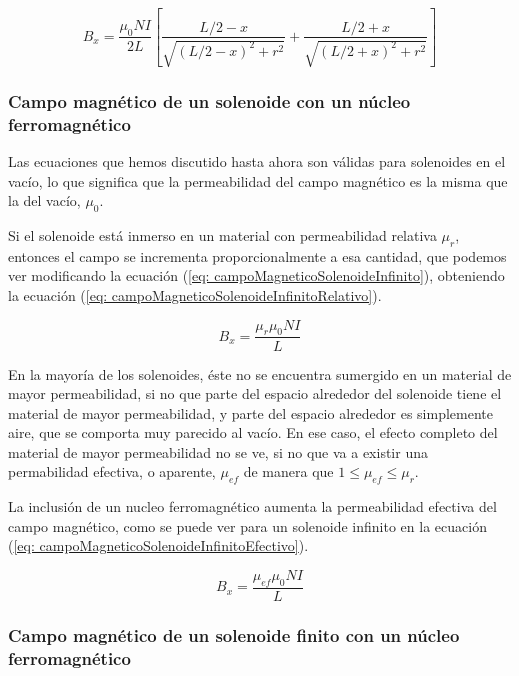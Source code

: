 \documentclass[a4paper,12pt]{article}
\begin{document}
        \begin{equation}
            \label{eq: campoMagneticoSolenoideFinito}
            B_x = \frac{\mu_0 N I}{2L} \left[ \frac{L/2 - x}{\sqrt{(L/2 - x)^2 + r^2}} + \frac{L/2 + x}{\sqrt{(L/2 + x)^2 + r^2}} \right]
        \end{equation}

    \subsubsection*{Campo magnético de un solenoide con un núcleo ferromagnético}

        Las ecuaciones que hemos discutido hasta ahora son válidas para solenoides en el vacío, lo que significa que la permeabilidad del campo magnético es la misma que la del vacío, $\mu_0$.

        Si el solenoide está inmerso en un material con permeabilidad relativa $\mu_r$, entonces el campo se incrementa proporcionalmente a esa cantidad, que podemos ver modificando la ecuación (\ref{eq: campoMagneticoSolenoideInfinito}), obteniendo la ecuación (\ref{eq: campoMagneticoSolenoideInfinitoRelativo}).

        \begin{equation}
            \label{eq: campoMagneticoSolenoideInfinitoRelativo}
            B_x = \frac{\mu_r\mu_0 N I}{L}
        \end{equation}

        En la mayoría de los solenoides, éste no se encuentra sumergido en un material de mayor permeabilidad, si no que parte del espacio alrededor del solenoide tiene el material de mayor permeabilidad, y parte del espacio alrededor es simplemente aire, que se comporta muy parecido al vacío. En ese caso, el efecto completo del material de mayor permeabilidad no se ve, si no que va a existir una permabilidad efectiva, o aparente, $\mu_{ef}$ de manera que $1 \leq \mu_{ef} \leq \mu_r$.

        La inclusión de un nucleo ferromagnético aumenta la permeabilidad efectiva del campo magnético, como se puede ver para un solenoide infinito en la ecuación (\ref{eq: campoMagneticoSolenoideInfinitoEfectivo}).

        \begin{equation}
            \label{eq: campoMagneticoSolenoideInfinitoEfectivo}
            B_x = \frac{\mu_{ef}\mu_0 N I}{L}
        \end{equation}

    \subsubsection*{Campo magnético de un solenoide finito con un núcleo ferromagnético}
\end{document}
